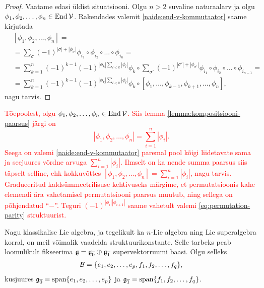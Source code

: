 \begin{proof}
    Vaatame edasi üldist situatsiooni. Olgu $n > 2$ suvaline
    naturaalarv ja olgu $\phi_1, \phi_2, \dots, \phi_n \in \operatorname{End} \mathcal{V}$.
    Rakendades valemit \eqref{naide:end-v-kommutaator} saame kirjutada
    \begin{align*}
        &[\phi_1, \phi_2, \dots, \phi_n] = \\
        &= \sum_\sigma (-1)^{|\sigma| + |\phi_\sigma|} \phi_{i_1} \circ
            \phi_{i_2} \circ \ldots \circ \phi_{i_n} = \\
        &= \sum_{k=1}^{n} (-1)^{k-1} (-1)^{|\phi_k| \sum_{l<k} |\phi_l|}
            \phi_k \circ \sum_{\sigma'}
            (-1)^{|\sigma'| + |\phi_{\sigma'}|}\phi_{i_1} \circ
            \phi_{i_2} \circ \ldots \circ \phi_{i_{n-1}} = \\
        &= \sum_{k=1}^{n} (-1)^{k-1} (-1)^{|\phi_k| \sum_{l<k} |\phi_l|}
            \phi_k \circ [
                \phi_1, \dots, \phi_{k-1}, \phi_{k+1}, \dots, \phi_n
            ],
    \end{align*}
    nagu tarvis.
\end{proof}

\textcolor{red}{
    Tõepoolest, olgu $\phi_1, \phi_2, \dots, \phi_n \in \operatorname{End} \mathcal{V}$.
    Siis lemma \ref{lemma:kompositsiooni-paarsus} järgi on
    \[ | \phi_1, \phi_2, \dots, \phi_n | = \sum_{i=1}^{n} |\phi_i|. \]
    Seega on valemi \eqref{naide:end-v-kommutaator} paremal pool kõigi liidetavate sama ja seejuures võrdne arvuga
    $\sum_{i=1}^{n} |\phi_i|$. Ilmselt on ka nende summa paarsus siis
    täpselt selline, ehk kokkuvõttes
    $ [\phi_1, \phi_2, \dots, \phi_n] = \sum_{i=1}^{n} |\phi_i| $,
    nagu tarvis. Gradueeritud kaldsümmeetrilisuse kehtivuseks
    märgime, et permutatsioonis kahe elemendi ära vahetamisel
    permutatsiooni paarsus muutub, ning sellega on põhjendatud
    "`$-$"'. Teguri $(-1)^{|\phi_i||\phi_{i+1}|}$ saame vahetult
    valemi \eqref{eq:permutation-parity} struktuurist.
}


Nagu klassikalise Lie algebra, ja tegelikult ka $n$-Lie algebra
ning Lie superalgebra korral, on meil võimalik vaadelda
struktuurikonstante. Selle tarbeks peab loomulikult fikseerima
$\mathfrak{g} = \mathfrak{g}_{\overline{0}} \oplus \mathfrak{g}_{\overline{1}}$ supervektorruumi
baasi. Olgu selleks
\begin{align}\label{n-lie-superalg-basis}
    \mathcal{B} = \{ e_1, e_2, \dots, e_p, f_1, f_2, \dots, f_q \},
\end{align}
kusjuures $\mathfrak{g}_{\overline{0}} = \operatorname{span} \{e_1, e_2, \dots, e_p\}$
ja $\mathfrak{g}_{\overline{1}} = \operatorname{span} \{f_1, f_2, \dots, f_q\}$.


